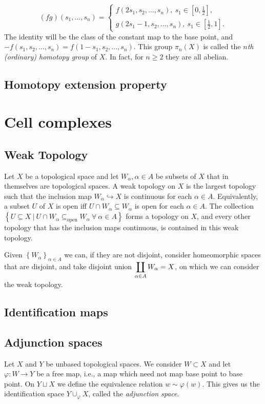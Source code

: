 \documentclass[a4paper,11pt]{article}
\newcommand{\lb}{\left(}
\newcommand{\rb}{\right)}
\newcommand{\lc}{\left\lbrace}
\newcommand{\rc}{\right\rbrace}
\newcommand{\ls}{\left[}
\newcommand{\rs}{\right]}
\renewcommand{\a}{\alpha}
\newcommand{\f}{\varphi}
\newcommand{\p}{\pi}
\newcommand{\tends}{\rightarrow}
\begin{document}
$$\lb fg\rb\lb s_1,\dots, s_n\rb=\begin{cases}
  f\lb 2s_1, s_2,\dots, s_n\rb,~s_1\in\ls 0, \frac{1}{2}\rs,\\
  g\lb 2s_1-1, s_2,\dots, s_n\rb,~s_1\in\ls \frac{1}{2}, 1\rs.
\end{cases}$$
The identity will be the class of the constant map to the base point, and $-f\lb s_1, s_2,\dots, s_n\rb=f\lb 1-s_1, s_2,\dots, s_n\rb$. This group $\p_n(X)$ is called the \emph{$n$th (ordinary) homotopy group} of $X$. In fact, for $n\geq 2$ they are all abelian.


\subsection{Homotopy extension property}

\section{Cell complexes}
\subsection{Weak Topology}
\noindent{}Let $X$ be a topological space and let $W_\a, \a\in A$ be subsets of $X$ that in themselves are topological spaces. A weak topology on $X$ is the largest topology such that the inclusion map $W_\a\hookrightarrow X$ is continuous for each $\a\in A$. Equivalently, a subset $U$ of $X$ is open iff $U\cap W_\a\subseteq W_\a$ is open for each $\a\in A$. The collection $\lc U\subseteq X~|~ U\cap W_\a\subseteq_{\text{open}} W_\a~\forall~\a\in A\rc$ forms a topology on $X$, and every other topology that has the inclusion maps continuous, is contained in this weak topology.

Given $\lc W_\a\rc_{\a\in A}$ we can, if they are not disjoint, consider homeomorphic spaces that are disjoint, and take disjoint union $\displaystyle\displaystyle\coprod_{\a\in A} W_\a=X$, on which we can consider the weak topology.

\subsection{Identification maps}

\subsection{Adjunction spaces}\noindent{}Let $X$ and $Y$ be unbased topological spaces. We consider $W\subset X$ and let $\f:W\tends Y$ be a free map, i.e., a map which need not map base point to base point. On $Y\sqcup X$ we define the equivalence relation $w\sim \f(w)$. This gives us the identification space $Y\cup_\f X$, called the \emph{adjunction space}.
\end{document}
